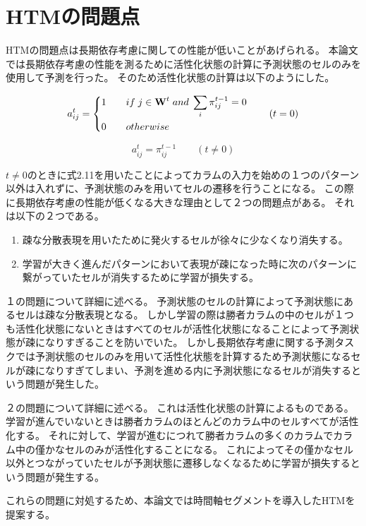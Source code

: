 \section{HTMの問題点}
HTMの問題点は長期依存考慮に関しての性能が低いことがあげられる。
本論文では長期依存考慮の性能を測るために活性化状態の計算に予測状態のセルのみを使用して予測を行った。
そのため活性化状態の計算は以下のようにした。

\begin{equation}
  a^t_{ij} =
  \left\{
  \begin{alignedat}{2}
      1 \qquad &if \; j\in{\bf W}^t \; and \; \sum_i \pi^{t-1}_{ij} = 0\\
      0 \qquad &otherwise\\
  \end{alignedat}
  \right. \qquad (t = 0)\\
\end{equation}

\begin{equation}
  a^t_{ij} = \pi^{t-1}_{ij} \qquad (t \neq 0)
\end{equation}

$t \neq 0$のときに式2.11を用いたことによってカラムの入力を始めの１つのパターン以外は入れずに、予測状態のみを用いてセルの遷移を行うことになる。
この際に長期依存考慮の性能が低くなる大きな理由として２つの問題点がある。
それは以下の２つである。

\begin{enumerate}
  \item 疎な分散表現を用いたために発火するセルが徐々に少なくなり消失する。
  \item 学習が大きく進んだパターンにおいて表現が疎になった時に次のパターンに繋がっていたセルが消失するために学習が損失する。
\end{enumerate}

１の問題について詳細に述べる。
予測状態のセルの計算によって予測状態にあるセルは疎な分散表現となる。
しかし学習の際は勝者カラムの中のセルが１つも活性化状態にないときはすべてのセルが活性化状態になることによって予測状態が疎になりすぎることを防いでいた。
しかし長期依存考慮に関する予測タスクでは予測状態のセルのみを用いて活性化状態を計算するため予測状態になるセルが疎になりすぎてしまい、予測を進める内に予測状態になるセルが消失するという問題が発生した。

２の問題について詳細に述べる。
これは活性化状態の計算によるものである。
学習が進んでいないときは勝者カラムのほとんどのカラム中のセルすべてが活性化する。
それに対して、学習が進むにつれて勝者カラムの多くのカラムでカラム中の僅かなセルのみが活性化することになる。
これによってその僅かなセル以外とつながっていたセルが予測状態に遷移しなくなるために学習が損失するという問題が発生する。

これらの問題に対処するため、本論文では時間軸セグメントを導入したHTMを提案する。
